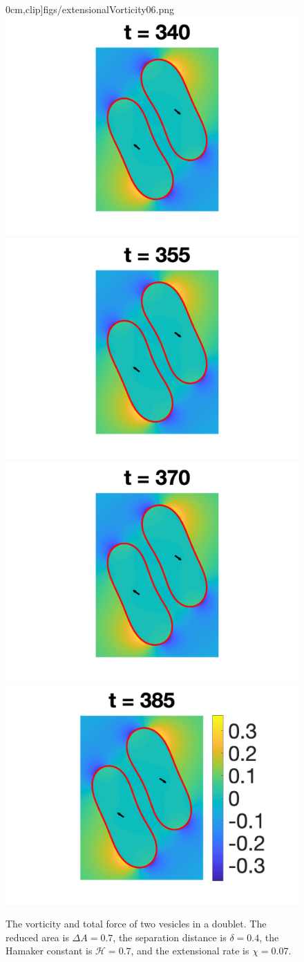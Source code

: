 \documentclass[prf,superscriptaddress,showkeys]{revtex4-1}
\begin{document}
\begin{figure}[htp]
{  0cm},clip]{figs/extensionalVorticity06.png}
  \includegraphics[height = 0.26\textwidth,trim={6cm 1cm 5cm
  0cm},clip]{figs/extensionalVorticity07.png}
  \includegraphics[height = 0.26\textwidth,trim={6cm 1cm 5cm
  0cm},clip]{figs/extensionalVorticity08.png}
  \includegraphics[height = 0.26\textwidth,trim={6cm 1cm 5cm
  0cm},clip]{figs/extensionalVorticity09.png}
  \includegraphics[height = 0.26\textwidth,trim={5cm 1cm 2cm
  0cm},clip]{figs/extensionalVorticity10.png}
  \caption{\label{fig:extensionalVorticity} The vorticity and total
  force of two vesicles in a doublet.  The reduced area is $\Delta A =
  0.7$, the separation distance is $\delta = 0.4$, the Hamaker constant
  is $\mathcal{H} = 0.7$, and the extensional rate is $\chi = 0.07$.}
\end{figure}


\end{document}
